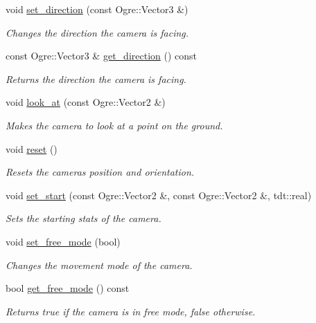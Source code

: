 \begin{DoxyCompactItemize}
void \hyperlink{class_camera_a66f1813809223a6746fb8a1c61961f0b}{set\+\_\+direction} (const Ogre\+::\+Vector3 \&)
\begin{DoxyCompactList}\small\item\em Changes the direction the camera is facing. \end{DoxyCompactList}\item 
const Ogre\+::\+Vector3 \& \hyperlink{class_camera_a572e91046d5610127d670dce74fb0b5e}{get\+\_\+direction} () const 
\begin{DoxyCompactList}\small\item\em Returns the direction the camera is facing. \end{DoxyCompactList}\item 
void \hyperlink{class_camera_ab7006a32d1c68a2e09f5aa1f19bf1e8e}{look\+\_\+at} (const Ogre\+::\+Vector2 \&)
\begin{DoxyCompactList}\small\item\em Makes the camera to look at a point on the ground. \end{DoxyCompactList}\item 
void \hyperlink{class_camera_a02be8aa0dbef77e02dddc715a726fb67}{reset} ()
\begin{DoxyCompactList}\small\item\em Resets the camera\textquotesingle{}s position and orientation. \end{DoxyCompactList}\item 
void \hyperlink{class_camera_ad24346aabd2c3a334b6a4b8c0bb433b6}{set\+\_\+start} (const Ogre\+::\+Vector2 \&, const Ogre\+::\+Vector2 \&, tdt\+::real)
\begin{DoxyCompactList}\small\item\em Sets the starting stats of the camera. \end{DoxyCompactList}\item 
void \hyperlink{class_camera_a320542638be37fd4a49014f87d7beb41}{set\+\_\+free\+\_\+mode} (bool)
\begin{DoxyCompactList}\small\item\em Changes the movement mode of the camera. \end{DoxyCompactList}\item 
bool \hyperlink{class_camera_a8cecaca1545eae90bf7e291a0b9c4cf9}{get\+\_\+free\+\_\+mode} () const 
\begin{DoxyCompactList}\small\item\em Returns true if the camera is in free mode, false otherwise. \end{DoxyCompactList}\item 

\end{DoxyCompactItemize}
